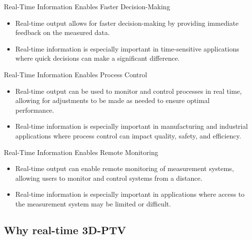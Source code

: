 \begin{frame}{Real-Time Information Enables Faster Decision-Making}

\begin{itemize}
\item Real-time output allows for faster decision-making by providing immediate feedback on the measured data.
\item Real-time information is especially important in time-sensitive applications where quick decisions can make a significant difference.
\end{itemize}

\end{frame}

\begin{frame}{Real-Time Information Enables Process Control}

\begin{itemize}
\item Real-time output can be used to monitor and control processes in real time, allowing for adjustments to be made as needed to ensure optimal performance.
\item Real-time information is especially important in manufacturing and industrial applications where process control can impact quality, safety, and efficiency.
\end{itemize}

\end{frame}

\begin{frame}{Real-Time Information Enables Remote Monitoring}

\begin{itemize}
\item Real-time output can enable remote monitoring of measurement systems, allowing users to monitor and control systems from a distance.
\item Real-time information is especially important in applications where access to the measurement system may be limited or difficult.
\end{itemize}

\end{frame}

\subsection{Why real-time 3D-PTV}

